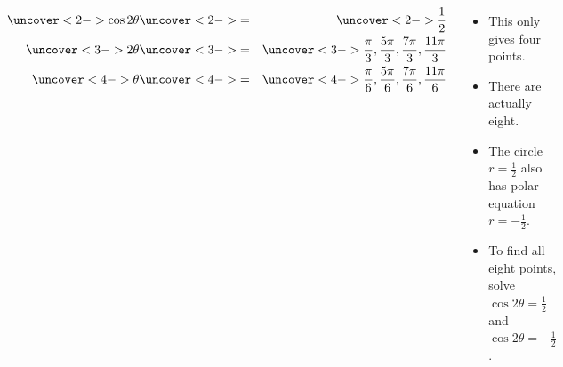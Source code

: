 \begin{frame}
\begin{example}
\begin{columns}[c]
{}%
%

\abovedisplayskip=0pt
\belowdisplayskip=0pt
\begin{eqnarray*}
\uncover<2->{%
\cos 2\theta%
}%
& \uncover<2->{ = } &%
\uncover<2->{%
\frac{1}{2}%
}\\%
\uncover<3->{%
2\theta%
}%
& \uncover<3->{ = } &%
\uncover<3->{%
\frac{\pi}{3}, \frac{5\pi}{3}, \frac{7\pi}{3}, \frac{11\pi}{3}%
}\\%
\uncover<4->{%
\theta%
}%
& \uncover<4->{ = } &%
\uncover<4->{%
\frac{\pi}{6}, \frac{5\pi}{6}, \frac{7\pi}{6}, \frac{11\pi}{6}%
}%
\end{eqnarray*}
\begin{itemize}
\item<5->  This only gives four points.
\item<6->  There are actually eight.
\item<7->  The circle $r = \frac{1}{2}$ also has polar equation $r = -\frac{1}{2}$.
\item<8->  To find all eight points, solve \alert<handout:0| 9>{$\cos 2\theta = \frac{1}{2}$} and \alert<handout:0| 10>{$\cos 2\theta = -\frac{1}{2}$}.
\end{itemize}
\end{columns}
\end{example}
\end{frame}
